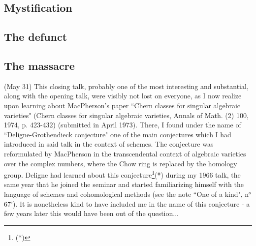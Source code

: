 
\subsection{Mystification}




\subsection{The defunct}


\subsection{The massacre}


 (May 31) This closing talk, probably one of the most interesting and substantial, along with  the opening talk, were visibly not lost on everyone, as I now realize upon learning about MacPherson's paper ``Chern classes for singular algebraic varieties" (Chern classes for singular algebraic varieties, Annals of Math. (2) 100, 1974, p. 423-432) (submitted in April 1973). There, I found under the name of ``Deligne-Grothendieck conjecture" one of the main conjectures which I had introduced in said talk in the context of schemes. The conjecture was reformulated by MacPherson in the transcendental context of algebraic varieties over the complex numbers, where the Chow ring is replaced by the homology group. Deligne had learned about this conjecture\footnote{(*)}(*) during my 1966 talk, the same year that he joined the seminar and started familiarizing himself with the language of schemes and cohomological methods (see the note ``One of a kind", n$^o$ 67'). It is nonetheless kind to have included me in the name of this conjecture - a few years later this would have been out of the question...


